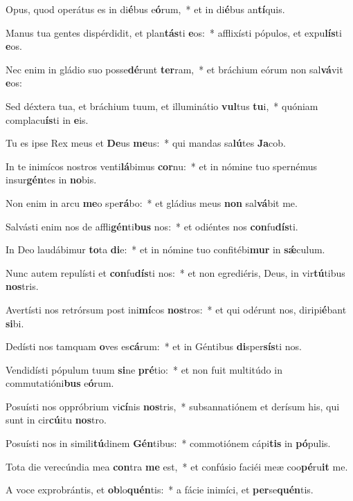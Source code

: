 \item Opus, quod operátus es in di\textbf{é}bus e\textbf{ó}rum,~* et in di\textbf{é}bus an\textbf{tí}quis.
\item Manus tua gentes dispérdidit, et plan\textbf{tás}ti \textbf{e}os:~* afflixísti pópulos, et expu\textbf{lís}ti \textbf{e}os.
\item Nec enim in gládio suo posse\textbf{dé}runt \textbf{ter}ram,~* et bráchium eórum non sal\textbf{vá}vit \textbf{e}os:
\item Sed déxtera tua, et bráchium tuum, et illuminátio \textbf{vul}tus \textbf{tu}i,~* quóniam complacu\textbf{ís}ti in \textbf{e}is.
\item Tu es ipse Rex meus et \textbf{De}us \textbf{me}us:~* qui mandas sa\textbf{lú}tes \textbf{Ja}cob.
\item In te inimícos nostros venti\textbf{lá}bimus \textbf{cor}nu:~* et in nómine tuo spernémus insur\textbf{gén}tes in \textbf{no}bis.
\item Non enim in arcu \textbf{me}o spe\textbf{rá}bo:~* et gládius meus \textbf{non} sal\textbf{vá}bit me.
\item Salvásti enim nos de affli\textbf{gén}ti\textbf{bus} nos:~* et odiéntes nos \textbf{con}fu\textbf{dís}ti.
\item In Deo laudábimur \textbf{to}ta \textbf{di}e:~* et in nómine tuo confitébi\textbf{mur} in \textbf{sǽ}culum.
\item Nunc autem repulísti et \textbf{con}fu\textbf{dís}ti nos:~* et non egrediéris, Deus, in vir\textbf{tú}tibus \textbf{nos}tris.
\item Avertísti nos retrórsum post ini\textbf{mí}cos \textbf{nos}tros:~* et qui odérunt nos, diripi\textbf{é}bant \textbf{si}bi.
\item Dedísti nos tamquam \textbf{o}ves es\textbf{cá}rum:~* et in Géntibus \textbf{di}sper\textbf{sís}ti nos.
\item Vendidísti pópulum tuum \textbf{si}ne \textbf{pré}tio:~* et non fuit multitúdo in commutatióni\textbf{bus} e\textbf{ó}rum.
\item Posuísti nos oppróbrium vi\textbf{cí}nis \textbf{nos}tris,~* subsannatiónem et derísum his, qui sunt in cir\textbf{cú}itu \textbf{nos}tro.
\item Posuísti nos in simili\textbf{tú}dinem \textbf{Gén}tibus:~* commotiónem cápi\textbf{tis} in \textbf{pó}pulis.
\item Tota die verecúndia mea \textbf{con}tra \textbf{me} est,~* et confúsio faciéi meæ coo\textbf{pé}ru\textbf{it} me.
\item A voce exprobrántis, et \textbf{ob}lo\textbf{quén}tis:~* a fácie inimíci, et \textbf{per}se\textbf{quén}tis.
